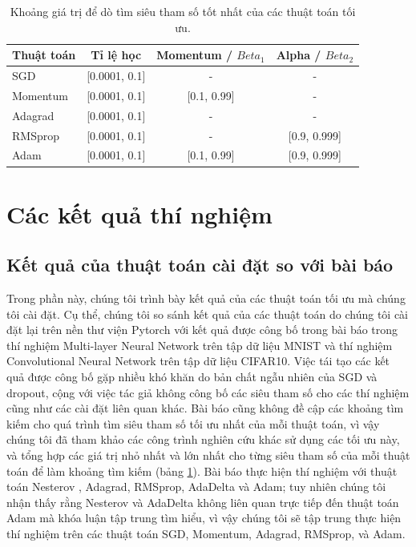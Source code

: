 \begin{center}
	\begin{table}
		\begin{tabular}{|l|c|c|c|}
			\hline
			Thuật toán & Tỉ lệ học & Momentum / $Beta_1$ & Alpha / $Beta_2$ \\
			\hline
			SGD & [0.0001, 0.1] & - & - \\
			\hline
			Momentum & [0.0001, 0.1] & [0.1, 0.99] & - \\
			\hline
			Adagrad & [0.0001, 0.1] & - & - \\
			\hline
			RMSprop & [0.0001, 0.1] & - & [0.9, 0.999] \\
			\hline
			Adam & [0.0001, 0.1] & [0.1, 0.99] & [0.9, 0.999] \\
			\hline
		\end{tabular}
	\caption{\label{tab:hparam-search}Khoảng giá trị để dò tìm siêu tham số tốt nhất của các thuật toán tối ưu.}
	\end{table}
\end{center}

\section{Các kết quả thí nghiệm}

\subsection{Kết quả của thuật toán cài đặt so với bài báo}

Trong phần này, chúng tôi trình bày kết quả của các thuật toán tối ưu mà chúng tôi cài đặt. Cụ thể, chúng tôi so sánh kết quả của các thuật toán do chúng tôi cài đặt lại trên nền thư viện Pytorch với kết quả được công bố trong bài báo trong thí nghiệm Multi-layer Neural Network trên tập dữ liệu MNIST và thí nghiệm Convolutional Neural Network trên tập dữ liệu CIFAR10. Việc tái tạo các kết quả được công bố gặp nhiều khó khăn do bản chất ngẫu nhiên của SGD và dropout, cộng với việc tác giả không công bố các siêu tham số cho các thí nghiệm cũng như các cài đặt liên quan khác. Bài báo cũng không đề cập các khoảng tìm kiếm cho quá trình tìm siêu tham số tối ưu nhất của mỗi thuật toán, vì vậy chúng tôi đã tham khảo các công trình nghiên cứu khác sử dụng các tối ưu này, và tổng hợp các giá trị nhỏ nhất và lớn nhất cho từng siêu tham số của mỗi thuật toán để làm khoảng tìm kiếm (bảng \ref{tab:hparam-search}). Bài báo thực hiện thí nghiệm với thuật toán Nesterov \cite{nesterov1983amf}, Adagrad, RMSprop, AdaDelta \cite{zeiler2012adadelta} và Adam; tuy nhiên chúng tôi nhận thấy rằng Nesterov và AdaDelta không liên quan trực tiếp đến thuật toán Adam mà khóa luận tập trung tìm hiểu, vì vậy chúng tôi sẽ tập trung thực hiện thí nghiệm trên các thuật toán SGD, Momentum, Adagrad, RMSprop, và Adam.

